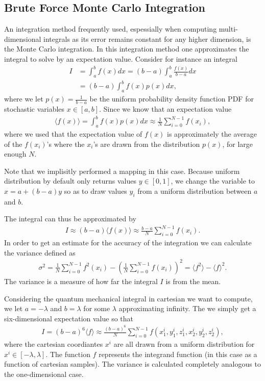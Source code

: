 \documentclass[twocolumn]{aastex62}
\begin{document}
\subsection{Brute Force Monte Carlo Integration}
An integration method frequently used, espessially when computing multi-dimensional integrals as its error remains constant for any higher dimension, is the Monte Carlo integration. In this integration method one approximates the integral to solve by an expectation value. Consider for instance an integral 
\begin{align}
	I &= \int^b_a f(x)dx = (b-a)\int^b_a\frac{f(x)}{b-a}dx \\	
	&= (b-a)\int^b_af(x)p(x)dx,
\end{align}
where we let $p(x) = \frac{1}{b-a}$ be the uniform probability density function PDF for stochastic variables $x\in[a, b]$. Since we know that an expectation value 
\begin{align}
	\langle f(x)\rangle = \int^b_a f(x)p(x)dx \approx \frac{1}{N}\sum_{i=0}^{N-1} f(x_i),
\end{align}
where we used that the expectation value of $f(x)$ is approximately the average of the $f(x_i)$'s where the $x_i$'s are drawn from the distribution $p(x)$, for large enough $N$. 

Note that we implisitly performed a mapping in this case. Because uniform distribution by default only returns values $y\in[0, 1]$, we change the variable to $x = a + (b-a)y$ so as to draw values $y_i$ from a uniform distribution between $a$ and $b$. 

The integral can thus be approximated by 
\begin{align}
	I \approx (b-a)\langle f(x) \rangle \approx \frac{b-a}{N}\sum^{N-1}_{i=0}f(x_i).
\end{align}
In order to get an estimate for the accuracy of the integration we can calculate the variance defined as 
\begin{align}
	\sigma^2 = \frac{1}{N}\sum_{i=0}^{N-1} f^2(x_i) - \left(\frac{1}{N}\sum_{i=0}^{N-1}f(x_i)\right)^2 = \langle f^2\rangle - \langle f\rangle^2.
\end{align}
The variance is a measure of how far the integral $I$ is from the mean.

Considering the quantum mechanical integral in cartesian we want to compute, we let $a=-\lambda$ and $b=\lambda$ for some $\lambda$ approximating infinity. The we simply get a six-dimensional expectation value so that 
\begin{align}
	I = (b-a)^6\langle f \rangle \approx \frac{(b-a)^6}{N}\sum^{N-1}_{i=0} f(x_1^i, y_1^i, z_1^i, x_2^i, y_2^i, z_2^i),
\end{align}
where the cartesian coordiantes $x^i$ are all drawn from a uniform distribution for $x^i\in[-\lambda, \lambda]$. The function $f$ represents the integrand function (in this case as a function of cartesian samples). The variance is calculated completely analogous to the one-dimensional case. 
\end{document}
